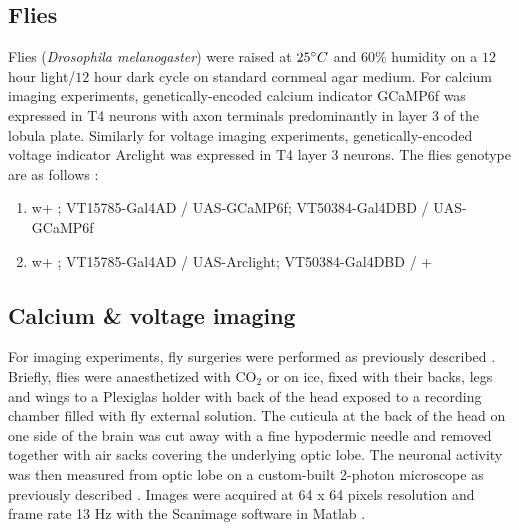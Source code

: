 \documentclass[9pt,lineno]{elife}
\begin{document}
\subsection{Flies}
Flies (\textit{Drosophila melanogaster}) were raised at $25\degree C$ and $60\%$ humidity on a $12$ hour light/$12$ hour dark cycle on standard cornmeal agar medium. For calcium imaging experiments, genetically-encoded calcium indicator GCaMP6f \parencite{Chen2013} was expressed in T4 neurons with axon terminals predominantly in  layer 3 of the lobula plate. Similarly for voltage imaging experiments, genetically-encoded voltage indicator Arclight \parencite{Jin2012} was expressed in T4 layer 3 neurons. The flies genotype are as follows : 
\begin{enumerate}
\item w+ ; VT15785-Gal4AD / UAS-GCaMP6f; VT50384-Gal4DBD / UAS-GCaMP6f 
\item w+ ; VT15785-Gal4AD / UAS-Arclight; VT50384-Gal4DBD / + 
\end{enumerate}

\subsection{Calcium \& voltage imaging}
For imaging experiments, fly surgeries were performed as previously described \parencite{Maisak2013}. Briefly, flies were anaesthetized with CO$_2$ or on ice, fixed with their backs, legs and wings to a Plexiglas holder with back of the head exposed to a recording chamber filled with fly external solution. The cuticula at the back of the head on one side of the brain was cut away with a fine hypodermic needle and removed together with air sacks covering the underlying optic lobe. The neuronal activity was then measured from optic lobe on a custom-built 2-photon microscope as previously described \parencite{Maisak2013}. Images were acquired at 64 x 64 pixels resolution and frame rate 13 Hz with the Scanimage software in Matlab  \parencite{Pologruto2003}.
\end{document}
